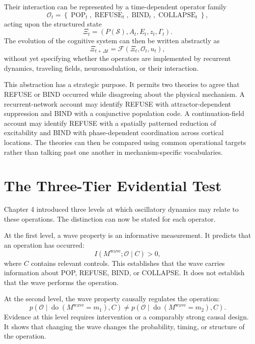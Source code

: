 \documentclass[11pt]{book}
\begin{document}
Their interaction can be represented by a time-dependent operator family
\[
\mathcal O_t
=
\left\{
\operatorname{POP}_t,
\operatorname{REFUSE}_t,
\operatorname{BIND}_t,
\operatorname{COLLAPSE}_t
\right\},
\]
acting upon the structured state
\[
\Xi_t
=
\left(
P(\mathcal S),
A_t,
E_t,
z_t,
\Gamma_t
\right).
\]
The evolution of the cognitive system can then be written abstractly as
\[
\Xi_{t+\Delta t}
=
\mathcal F\!\left(
\Xi_t,
\mathcal O_t,
u_t
\right),
\]
without yet specifying whether the operators are implemented by recurrent dynamics, traveling fields, neuromodulation, or their interaction.

This abstraction has a strategic purpose. It permits two theories to agree that REFUSE or BIND occurred while disagreeing about the physical mechanism. A recurrent-network account may identify REFUSE with attractor-dependent suppression and BIND with a conjunctive population code. A continuation-field account may identify REFUSE with a spatially patterned reduction of excitability and BIND with phase-dependent coordination across cortical locations. The theories can then be compared using common operational targets rather than talking past one another in mechanism-specific vocabularies.

\section*{The Three-Tier Evidential Test}

Chapter 4 introduced three levels at which oscillatory dynamics may relate to these operations. The distinction can now be stated for each operator.

At the first level, a wave property is an informative measurement. It predicts that an operation has occurred:
\[
I(M^{\mathrm{wave}};\mathcal O\mid C)>0,
\]
where $C$ contains relevant controls. This establishes that the wave carries information about POP, REFUSE, BIND, or COLLAPSE. It does not establish that the wave performs the operation.

At the second level, the wave property causally regulates the operation:
\[
p\!\left(\mathcal O\mid
\operatorname{do}(M^{\mathrm{wave}}=m_1),C\right)
\neq
p\!\left(\mathcal O\mid
\operatorname{do}(M^{\mathrm{wave}}=m_2),C\right).
\]
Evidence at this level requires intervention or a comparably strong causal design. It shows that changing the wave changes the probability, timing, or structure of the operation.
\end{document}
